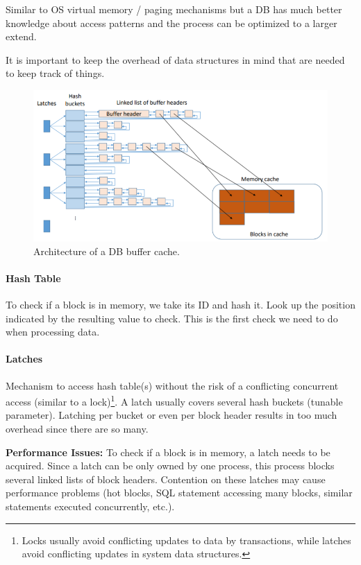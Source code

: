 Similar to OS virtual memory / paging mechanisms but a DB has much better knowledge about access patterns and the process can be optimized to a larger extend.

It is important to keep the overhead of data structures in mind that are needed to keep track of things.

\begin{figure}[h]
	\centering
	\includegraphics[scale=0.8]{images/1-buffer.PNG}
	\caption{Architecture of a DB buffer cache.}
	\label{fig:buffer}
\end{figure}

\paragraph{Hash Table}
To check if a block is in memory, we take its ID and hash it. Look up the position indicated by the resulting value to check. This is the first check we need to do when processing data.

\paragraph{Latches}
Mechanism to access hash table(s) without the risk of a conflicting concurrent access (similar to a lock)\footnote{Locks usually avoid conflicting updates to data by transactions, while latches avoid conflicting updates in system data structures.}. A latch usually covers several hash buckets (tunable parameter). Latching per bucket or even per block header results in too much overhead since there are so many. %

\textbf{Performance Issues:} To check if a block is in memory, a latch needs to be acquired. Since a latch can be only owned by one process, this process blocks several linked lists of block headers. Contention on these latches may cause performance problems (hot blocks, SQL statement accessing many blocks, similar statements executed concurrently, etc.).

